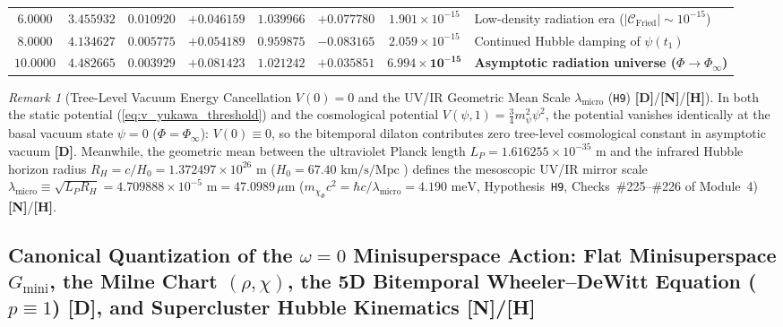 \documentclass[11pt,a4paper]{article}
\newcommand{\catD}{\textbf{\textcolor{blue!75!black}{[D]}}}
\newcommand{\catH}{\textbf{\textcolor{orange!85!black}{[H]}}}
\newcommand{\catN}{\textbf{\textcolor{teal!75!black}{[N]}}}
\theoremstyle{definition}
\theoremstyle{remark}
\newtheorem{remark}[theorem]{Remark}
\begin{document}
\begin{table}[H]
{\begin{tabular}{@{} c c c c c c c l @{}}
    $6.0000$ & $3.455932$ & $0.010920$ & $+0.046159$ & $1.039966$ & $+0.077780$ & $1.901 \times 10^{-15}$ & Low-density radiation era ($|\mathcal{C}_{\text{Fried}}| \sim 10^{-15}$) \\
    $8.0000$ & $4.134627$ & $0.005775$ & $+0.054189$ & $0.959875$ & $-0.083165$ & $2.059 \times 10^{-15}$ & Continued Hubble damping of $\psi(t_1)$ \\
    $\mathbf{10.0000}$ & $\mathbf{4.482665}$ & $\mathbf{0.003929}$ & $\mathbf{+0.081423}$ & $\mathbf{1.021242}$ & $\mathbf{+0.035851}$ & $\mathbf{6.994 \times 10^{-15}}$ & \textbf{Asymptotic radiation universe ($\Phi \to \Phi_{\infty}$)} \\
    \bottomrule
  \end{tabular}%
  }
\end{table}

\begin{remark}[Tree-Level Vacuum Energy Cancellation $V(0) = 0$ and the UV/IR Geometric Mean Scale $\lambda_{\text{micro}}$ (\texttt{H9}) \catD/\catN/\catH]
\label{rem:uv_ir_fulcrum}
In both the static potential (\ref{eq:v_yukawa_threshold}) and the cosmological potential $V(\psi, 1) = \frac{3}{4}m_{\psi}^2\psi^2$, the potential vanishes identically at the basal vacuum state $\psi = 0$ ($\Phi = \Phi_{\infty}$): $V(0) \equiv 0$, so the bitemporal dilaton contributes zero tree-level cosmological constant in asymptotic vacuum \catD. Meanwhile, the geometric mean between the ultraviolet Planck length $L_P = 1.616255 \times 10^{-35}\text{ m}$ and the infrared Hubble horizon radius $R_H = c/H_0 = 1.372497 \times 10^{26}\text{ m}$ ($H_0 = 67.40\text{ km/s/Mpc}$ \cite{Planck2018}) defines the mesoscopic UV/IR mirror scale $\lambda_{\text{micro}} \equiv \sqrt{L_P R_H} = 4.709888 \times 10^{-5}\text{ m} = 47.0989\,\mu\text{m}$ ($m_{\chi_{\Phi}}c^2 = \hbar c/\lambda_{\text{micro}} = 4.190\text{ meV}$, Hypothesis~\texttt{H9}, Checks~\#225--\#226 of Module~4) \catN/\catH.
\end{remark}

\subsection{\texorpdfstring{Canonical Quantization of the $\omega = 0$ Minisuperspace Action: Flat Minisuperspace $G_{\text{mini}}$, the Milne Chart $(\rho, \chi)$, the 5D Bitemporal Wheeler--DeWitt Equation ($p \equiv 1$) \catD, and Supercluster Hubble Kinematics \catN/\catH}{Canonical Quantization of the omega = 0 Minisuperspace Action: The 5D Bitemporal Wheeler-DeWitt Equation and Supercluster Hubble Kinematics}}
\end{document}
